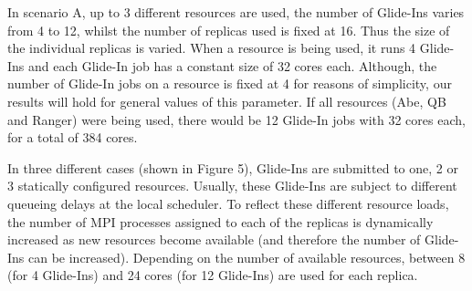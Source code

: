 \documentclass{rspublic}
\newcommand{\alnote}[1]{ {\textcolor{blue} { ***AL: #1 }}}
\newcommand{\jhanote}[1]{ {\textcolor{red} { ***SJ: #1 }}}
\newcommand{\alnote}[1]{}
\newcommand{\jhanote}[1]{}
\begin{document}

In scenario A, up to 3 different resources are used, the number of
Glide-Ins varies from 4 to 12, whilst the number of replicas used is
fixed at 16. Thus the size of the individual replicas is varied.  When
a resource is being used, it runs 4 Glide-Ins and each Glide-In job
has a constant size of 32 cores each.  Although, the number of
Glide-In jobs on a resource is fixed at 4 for reasons of simplicity,
our results will hold for general values of this parameter. If all
resources (Abe, QB and Ranger) were being used, there would be 12
Glide-In jobs with 32 cores each, for a total of 384 cores.

In three different cases (shown in Figure 5), Glide-Ins are submitted
to one, 2 or 3 statically configured resources. Usually, these
Glide-Ins are subject to different queueing delays at the local
scheduler. To reflect these different resource loads, the number of
MPI processes assigned to each of the replicas is dynamically
increased as new resources become available (and therefore the number
of Glide-Ins can be increased). Depending on the number of available
resources, between 8 (for 4 Glide-Ins) and 24 cores (for 12 Glide-Ins)
are used for each replica.
\end{document}

